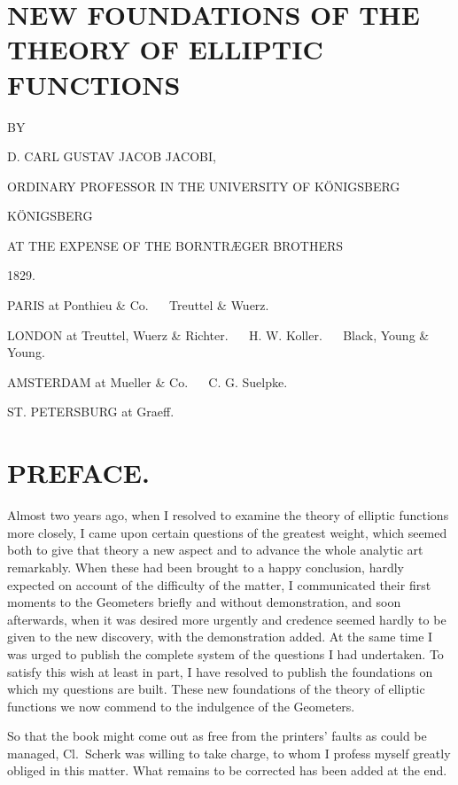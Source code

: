 \documentclass{article}
\begin{document}

\section*{NEW FOUNDATIONS OF THE THEORY OF ELLIPTIC FUNCTIONS}

BY

D. CARL GUSTAV JACOB JACOBI,

ORDINARY PROFESSOR IN THE UNIVERSITY OF KÖNIGSBERG

KÖNIGSBERG

AT THE EXPENSE OF THE BORNTRÆGER BROTHERS

1829.

PARIS at Ponthieu \& Co. $\quad$ Treuttel \& Wuerz.

LONDON at Treuttel, Wuerz \& Richter. $\quad$ H. W. Koller. $\quad$ Black, Young \& Young.

AMSTERDAM at Mueller \& Co. $\quad$ C. G. Suelpke.

ST. PETERSBURG at Graeff.


\section*{PREFACE.}

Almost two years ago, when I resolved to examine the theory of elliptic functions more closely, I came upon certain questions of the greatest weight, which seemed both to give that theory a new aspect and to advance the whole analytic art remarkably. When these had been brought to a happy conclusion, hardly expected on account of the difficulty of the matter, I communicated their first moments to the Geometers briefly and without demonstration, and soon afterwards, when it was desired more urgently and credence seemed hardly to be given to the new discovery, with the demonstration added. At the same time I was urged to publish the complete system of the questions I had undertaken. To satisfy this wish at least in part, I have resolved to publish the foundations on which my questions are built. These new foundations of the theory of elliptic functions we now commend to the indulgence of the Geometers.


So that the book might come out as free from the printers' faults as could be managed, Cl.\ Scherk was willing to take charge, to whom I profess myself greatly obliged in this matter. What remains to be corrected has been added at the end.
\end{document}
